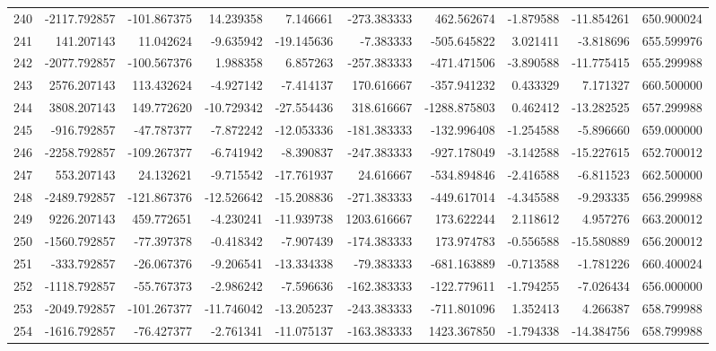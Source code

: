 \begin{tabular}{lrrrrrrrrr}
240 &  -2117.792857 &  -101.867375 &  14.239358 &   7.146661 &  -273.383333 &   462.562674 &  -1.879588 & -11.854261 &  650.900024 \\
241 &    141.207143 &    11.042624 &  -9.635942 & -19.145636 &    -7.383333 &  -505.645822 &   3.021411 &  -3.818696 &  655.599976 \\
242 &  -2077.792857 &  -100.567376 &   1.988358 &   6.857263 &  -257.383333 &  -471.471506 &  -3.890588 & -11.775415 &  655.299988 \\
243 &   2576.207143 &   113.432624 &  -4.927142 &  -7.414137 &   170.616667 &  -357.941232 &   0.433329 &   7.171327 &  660.500000 \\
244 &   3808.207143 &   149.772620 & -10.729342 & -27.554436 &   318.616667 & -1288.875803 &   0.462412 & -13.282525 &  657.299988 \\
245 &   -916.792857 &   -47.787377 &  -7.872242 & -12.053336 &  -181.383333 &  -132.996408 &  -1.254588 &  -5.896660 &  659.000000 \\
246 &  -2258.792857 &  -109.267377 &  -6.741942 &  -8.390837 &  -247.383333 &  -927.178049 &  -3.142588 & -15.227615 &  652.700012 \\
247 &    553.207143 &    24.132621 &  -9.715542 & -17.761937 &    24.616667 &  -534.894846 &  -2.416588 &  -6.811523 &  662.500000 \\
248 &  -2489.792857 &  -121.867376 & -12.526642 & -15.208836 &  -271.383333 &  -449.617014 &  -4.345588 &  -9.293335 &  656.299988 \\
249 &   9226.207143 &   459.772651 &  -4.230241 & -11.939738 &  1203.616667 &   173.622244 &   2.118612 &   4.957276 &  663.200012 \\
250 &  -1560.792857 &   -77.397378 &  -0.418342 &  -7.907439 &  -174.383333 &   173.974783 &  -0.556588 & -15.580889 &  656.200012 \\
251 &   -333.792857 &   -26.067376 &  -9.206541 & -13.334338 &   -79.383333 &  -681.163889 &  -0.713588 &  -1.781226 &  660.400024 \\
252 &  -1118.792857 &   -55.767373 &  -2.986242 &  -7.596636 &  -162.383333 &  -122.779611 &  -1.794255 &  -7.026434 &  656.000000 \\
253 &  -2049.792857 &  -101.267377 & -11.746042 & -13.205237 &  -243.383333 &  -711.801096 &   1.352413 &   4.266387 &  658.799988 \\
254 &  -1616.792857 &   -76.427377 &  -2.761341 & -11.075137 &  -163.383333 &  1423.367850 &  -1.794338 & -14.384756 &  658.799988 \\

\end{tabular}
